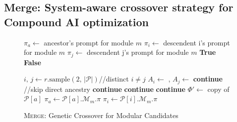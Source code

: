 \documentclass{article} %
\begin{document}
\subsection{Merge: System-aware crossover strategy for Compound AI optimization}\label{sec:merge}
\begin{figure}[t]
\centering
\begin{minipage}[t]{0.47\textwidth}
\begin{algorithm}[H]
\caption{Check if module combination is desirable}
\label{alg:desirable_short}
\begin{algorithmic}[1]
\small
{}
        \State $\pi_a \gets$ ancestor's prompt for module $m$
        \State $\pi_i \gets$ descendent i's prompt for module $m$
        \State $\pi_j \gets$ descendent j's prompt for module $m$
            \State \Return \textbf{True}
        \EndIf
    \EndFor
    \State \Return \textbf{False}
\EndFunction
\end{algorithmic}
\end{algorithm}
\end{minipage}%
%
\hfill
%
\begin{minipage}[t]{0.51\textwidth}
\begin{algorithm}[H]
\caption{\textsc{Merge}: Genetic Crossover for Modular Candidates}
\label{alg:merge_short}
\begin{algorithmic}[1]
\small
{}
        \State $i,\,j \gets r.\text{sample}(2,\,|\mathcal{P}|)$\quad //\;distinct $i\neq j$
        \State $A_i \gets$ , $A_j \gets$ 
            \State \textbf{continue} \quad//\;skip direct ancestry
        \EndIf
                \State \textbf{continue}
            \EndIf
                \State \textbf{continue}
            \EndIf
                \State \textbf{continue}
            \EndIf
            \State $\Phi' \gets$ copy of $\mathcal{P}[a]$
                \State $\pi_a \gets \mathcal{P}[a].\mathcal{M}_m.\pi$
                \State $\pi_i \gets \mathcal{P}[i].\mathcal{M}_m.\pi$

\end{algorithmic}
\end{algorithm}
\end{minipage}
\end{figure}
\end{document}
